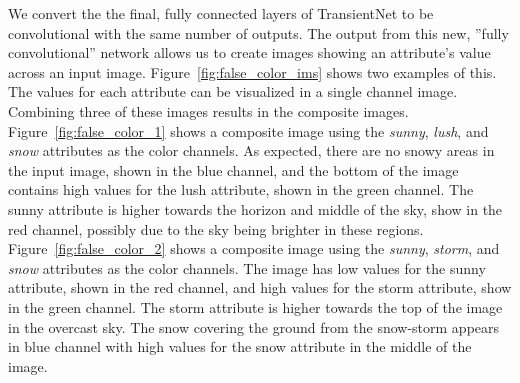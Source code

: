 \documentclass[10pt,twocolumn,letterpaper]{article}
\newcommand{\figref}[1]{Figure~\ref{fig:#1}}
\begin{document}
We convert the the final, fully connected layers of TransientNet to be
convolutional with the same number of outputs.  The output from this new,
''fully convolutional'' network allows us to create images showing an
attribute's value across an input image.  \figref{false_color_ims} shows two
examples of this.  The values for each attribute can be visualized in a single
channel image.  Combining three of these images results in the composite
images.  \figref{false_color_1} shows a composite image using the
\textit{sunny}, \textit{lush}, and \textit{snow} attributes as the color
channels.  As expected, there are no snowy areas in the input image, shown
in the blue channel, and the bottom of the image contains high values for the
lush attribute, shown in the green channel.  The sunny attribute is higher 
towards the horizon and middle of the sky, show in the red channel, possibly 
due to the sky being brighter in these regions.  \figref{false_color_2} shows
a composite image using the \textit{sunny}, \textit{storm}, and \textit{snow}
attributes as the color channels.  The image has low values for the sunny
attribute, shown in the red channel, and high values for the storm attribute,
show in the green channel.  The storm attribute is higher towards the top
of the image in the overcast sky.  The snow covering the ground from the 
snow-storm appears in blue channel with high values for the snow attribute in
the middle of the image.
\end{document}
